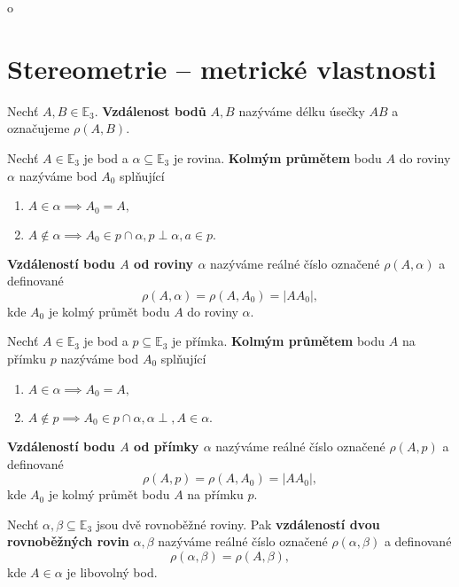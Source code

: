 o\section{Stereometrie -- metrické vlastnosti}
\begin{definition}
    Nechť $A, B \in \mathbb E_3.$ \textbf{Vzdálenost bodů} $A,B$ nazýváme délku
    úsečky $AB$ a označujeme $\rho(A,B).$
\end{definition}

\begin{definition}
    Nechť $A\in \mathbb E_3$ je bod a $\alpha \subseteq \mathbb E_3$ je rovina.
    \textbf{Kolmým průmětem} bodu $A$ do roviny $\alpha$ nazýváme bod $A_0$
    splňující
    \begin{enumerate}[$i.$]
    \item $A\in \alpha \implies A_0=A,$
   	\item $A\notin \alpha \implies A_0 \in p\cap \alpha, p \perp\alpha, a \in p.$
    \end{enumerate}
    \textbf{Vzdáleností bodu $A$ od roviny $\alpha$} nazýváme reálné číslo označené
    $\rho(A,\alpha) $ a definované
    $$\rho(A,\alpha) = \rho(A, A_0) = |AA_0|,$$
    kde $A_0$ je kolmý průmět bodu $A$ do roviny $\alpha.$
\end{definition}

\begin{definition}
    Nechť $A\in \mathbb E_3$ je bod a $p \subseteq \mathbb E_3$ je přímka.
    \textbf{Kolmým průmětem} bodu $A$ na přímku $p$ nazýváme bod $A_0$
    splňující
    \begin{enumerate}[$i.$]
    \item $A\in \alpha \implies A_0=A,$
    \item $A\notin p \implies A_0 \in p\cap \alpha, \alpha \perp, A \in \alpha.$
    \end{enumerate}
    \textbf{Vzdáleností bodu $A$ od přímky $\alpha$} nazýváme reálné číslo označené
    $\rho(A,p) $ a definované
    $$\rho(A,p) = \rho(A, A_0) = |AA_0|,$$
    kde $A_0$ je kolmý průmět bodu $A$ na přímku $p.$
\end{definition}

\begin{definition}
    Nechť $\alpha, \beta \subseteq \mathbb E_3$ jsou dvě rovnoběžné roviny. Pak
    \textbf{vzdáleností dvou rovnoběžných rovin} $\alpha, \beta$ nazýváme reálné
    číslo označené $\rho(\alpha, \beta)$ a definované
    $$\rho(\alpha, \beta)=\rho(A,\beta),$$
    kde $A\in\alpha$ je libovolný bod.
\end{definition}

